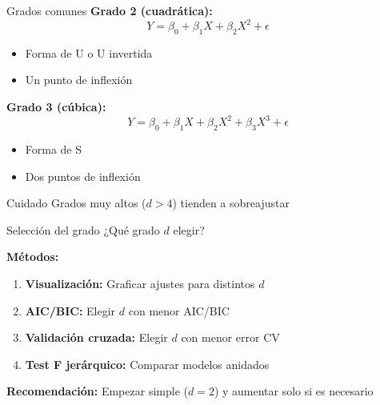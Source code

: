 \documentclass[aspectratio=169]{beamer}
\begin{document}
\begin{frame}{Grados comunes}
\textbf{Grado 2 (cuadrática):}
\[
Y = \beta_0 + \beta_1 X + \beta_2 X^2 + \epsilon
\]
\begin{itemize}
    \item Forma de U o U invertida
    \item Un punto de inflexión
\end{itemize}

\vspace{0.3cm}
\textbf{Grado 3 (cúbica):}
\[
Y = \beta_0 + \beta_1 X + \beta_2 X^2 + \beta_3 X^3 + \epsilon
\]
\begin{itemize}
    \item Forma de S
    \item Dos puntos de inflexión
\end{itemize}

\vspace{0.5cm}
\begin{alertblock}{Cuidado}
Grados muy altos ($d > 4$) tienden a sobreajustar
\end{alertblock}
\end{frame}

\begin{frame}{Selección del grado}
¿Qué grado $d$ elegir?

\vspace{0.3cm}
\textbf{Métodos:}
\begin{enumerate}
    \item \textbf{Visualización:} Graficar ajustes para distintos $d$
    \item \textbf{AIC/BIC:} Elegir $d$ con menor AIC/BIC
    \item \textbf{Validación cruzada:} Elegir $d$ con menor error CV
    \item \textbf{Test F jerárquico:} Comparar modelos anidados
\end{enumerate}

\vspace{0.5cm}
\textbf{Recomendación:} Empezar simple ($d=2$) y aumentar solo si es necesario
\end{frame}
\end{document}
